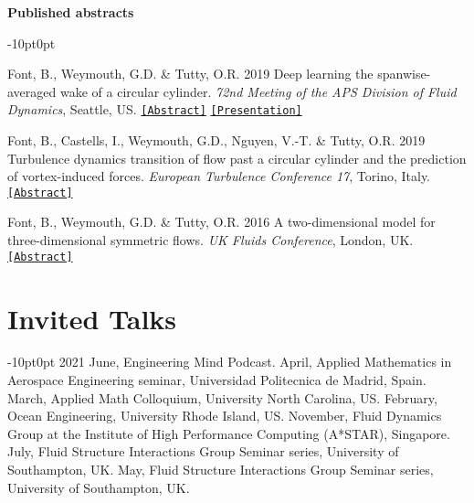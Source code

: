 \documentclass[line]{res}
\newenvironment{p}
  {\begin{adjustwidth}{-10pt}{0pt}}
  {\end{adjustwidth}}
\begin{document}
\begin{resume}
\hspace{-1cm}\textbf{Published abstracts}\vspace{0.25cm}
\begin{p}
\begin{etaremune}[leftmargin=-2pt,parsep=5pt]
\item Font, B., Weymouth, G.D.  \&  Tutty, O.R. 2019  Deep learning the spanwise-averaged wake of a circular cylinder. \textit{72nd Meeting of the APS Division of Fluid Dynamics}, Seattle, US. \href{https://meetings.aps.org/Meeting/DFD19/Session/L17.5}{\texttt{[Abstract]}} \href{https://github.com/b-fg/APS2019}{\texttt{[Presentation]}}
\item Font, B., Castells, I., Weymouth, G.D., Nguyen, V.-T.  \&  Tutty, O.R. 2019  Turbulence dynamics transition of flow past a circular cylinder and the prediction of vortex-induced forces. \textit{European Turbulence Conference 17}, Torino, Italy. \href{https://etc17.fyper.com/program/show_slot/41}{\texttt{[Abstract]}}
\item Font, B., Weymouth, G.D.  \&  Tutty, O.R. 2016  A two-dimensional model for three-dimensional symmetric flows. \textit{UK Fluids Conference}, London, UK. \href{https://www.imperial.ac.uk/media/imperial-college/faculty-of-engineering/aeronautics/UK-Fluids-Conference-2016-booklet.pdf}{\texttt{[Abstract]}}
\end{etaremune}
\end{p}

\section{Invited Talks}\vspace{0.5cm}
\begin{p}
2021 June, Engineering Mind Podcast.  April, Applied Mathematics in Aerospace Engineering seminar, Universidad Politecnica de Madrid, Spain.  March, Applied Math Colloquium, University North Carolina, US.  February, Ocean Engineering, University Rhode Island, US.  November, Fluid Dynamics Group at the Institute of High Performance Computing (A*STAR), Singapore.  July, Fluid Structure Interactions Group Seminar series, University of Southampton, UK.  May, Fluid Structure Interactions Group Seminar series, University of Southampton, UK.
\end{p}


\end{resume}
\end{document}
